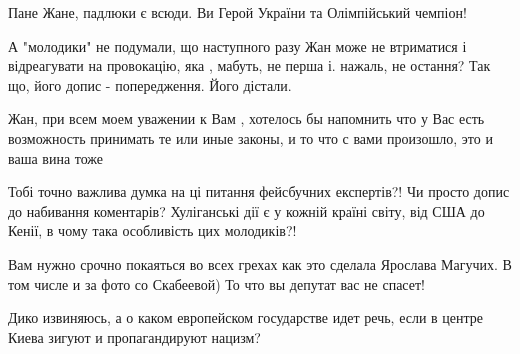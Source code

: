 \begin{itemize}
Пане Жане, падлюки є всюди. Ви Герой України та Олімпійський чемпіон!

 
А "молодики" не подумали, що наступного разу Жан може не втриматися і відреагувати на провокацію, яка , мабуть, не перша і. нажаль, не остання? Так що, його допис - попередження. Його дістали.

 

Жан, при всем моем уважении к Вам , хотелось бы напомнить что у Вас есть
возможность принимать те или иные законы, и то что с вами произошло, это и ваша
вина тоже

 
Тобі точно важлива думка на ці питання фейсбучних експертів?!
Чи просто допис до набивання коментарів?
Хуліганські дії є у кожній країні світу, від США до Кенії, в чому така особливість цих молодиків?!

 
Вам нужно срочно покаяться во всех грехах как это сделала Ярослава Магучих.
В том числе и за фото со Скабеевой) То что вы депутат вас не спасет!

 
Дико извиняюсь, а о каком европейском государстве идет речь, если в центре Киева зигуют и пропагандируют нацизм?


\end{itemize}
